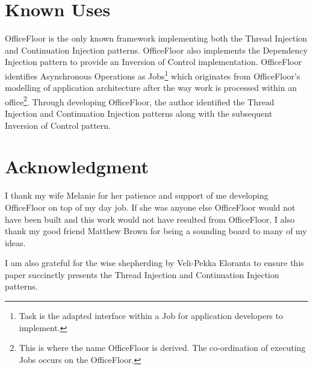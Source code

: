 \documentclass[prodmode]{style/acmlarge}
\begin{document}
\section{Known Uses}

OfficeFloor \cite{officefloor} is the only known framework implementing both the
Thread Injection and Continuation Injection patterns.  OfficeFloor also
implements the Dependency Injection pattern to provide an Inversion of Control
implementation.  OfficeFloor identifies Asynchronous Operations as
Jobs\footnote{Task is the adapted interface within a Job for application
developers to implement.} which originates from OfficeFloor's modelling of
application architecture after the way work is processed within an
office\footnote{This is where the name OfficeFloor is derived. The co-ordination
of executing Jobs occurs on the OfficeFloor.}.  Through developing OfficeFloor,
the author identified the Thread Injection and Continuation Injection patterns
along with the subsequent Inversion of Control pattern.


\section*{Acknowledgment} I thank my wife Melanie for her patience and support
of me developing OfficeFloor on top of my day job.  If she was anyone else
OfficeFloor would not have been built and this work would not have resulted from
OfficeFloor.  I also thank my good friend Matthew Brown for being a sounding
board to many of my ideas.

I am also grateful for the wise shepherding by Veli-Pekka Eloranta to ensure
this paper succinctly presents the Thread Injection and Continuation Injection
patterns.




\end{document}
